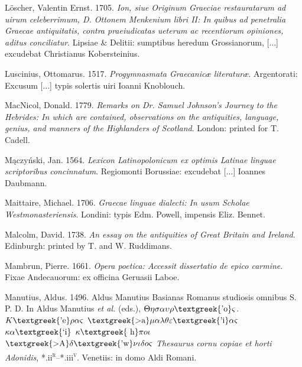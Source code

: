 \begin{styleStandard}
Löscher, Valentin Ernst. 1705. \textit{Ion, siue Originum Graeciae restauratarum ad uirum celeberrimum, D. Ottonem Menkenium libri II: In quibus ad penetralia Graecae antiquitatis, contra praeiudicatas ueterum ac recentiorum opiniones, aditus conciliatur}. Lipsiae \& Delitii: sumptibus heredum Grossianorum, [...] excudebat Christianus Kobersteinius.
\end{styleStandard}

\begin{styleStandard}
Luscinius, Ottomarus. 1517. \textit{Progymnasmata Graecanicæ literaturæ}. Argentorati: Excusum [...] typis solertis uiri Ioanni Knoblouch.
\end{styleStandard}

\begin{styleStandard}
MacNicol, Donald. 1779. \textit{Remarks on Dr. Samuel Johnson’s Journey to the Hebrides: In which are contained, observations on the antiquities, language, genius, and manners of the Highlanders of Scotland}. London: printed for T. Cadell.
\end{styleStandard}

\begin{styleStandard}
Mączyński, Jan. 1564. \textit{Lexicon Latinopolonicum ex optimis Latinae linguae scriptoribus concinnatum}. Regiomonti Borussiae: excudebat [...] Ioannes Daubmann.
\end{styleStandard}

\begin{styleStandard}
Maittaire, Michael. 1706. \textit{Graecae linguae dialecti: In usum Scholae Westmonasteriensis}. Londini: typis Edm. Powell, impensis Eliz. Bennet.
\end{styleStandard}

\begin{styleStandard}
Malcolm, David. 1738. \textit{An essay on the antiquities of Great Britain and Ireland}. Edinburgh: printed by T. and W. Ruddimans.
\end{styleStandard}

\begin{styleStandard}
Mambrun, Pierre. 1661. \textit{Opera poetica: Accessit dissertatio de epico carmine}. Fixae Andecauorum: ex officina Geruasii Laboe.
\end{styleStandard}

\begin{styleStandard}
Manutius, Aldus. 1496. Aldus Manutius Basianas Romanus studiosis omnibus S. P. D. In Aldus Manutius \textit{et al.} (eds.), \textit{$\Theta \eta \sigma \alpha \upsilon \rho \text{\textgreek{'o}}\varsigma $. $K\text{\textgreek{'e}}\rho \alpha \varsigma $ $\text{\textgreek{>a}}\mu \alpha \lambda \theta \varepsilon \text{\textgreek{'i}}\alpha \varsigma $ $\kappa \alpha \text{\textgreek{`i}}$ $\kappa \text{\textgreek{~h}}\pi o\iota $ $\text{\textgreek{>A}}\delta \text{\textgreek{'w}}\nu \iota \delta o\varsigma $ {\textbar} Thesaurus cornu copiae et horti Adonidis}, *.ii\textsc{\textsuperscript{r}}–*.iii\textsc{\textsuperscript{v}}. Venetiis: in domo Aldi Romani.
\end{styleStandard}

